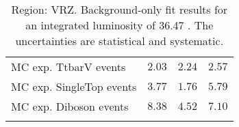 \begin{table}
\begin{center}
{\begin{tabular*}{\textwidth}{@{\extracolsep{\fill}}lrrr}
        MC exp. TtbarV events         & $2.03$          & $2.24$          & $2.57$              \\
        MC exp. SingleTop events         & $3.77$          & $1.76$          & $5.79$              \\
        MC exp. Diboson events         & $8.38$          & $4.52$          & $7.10$              \\
\noalign{\smallskip}\hline\noalign{\smallskip}
\end{tabular*}
}
\end{center}
\caption{Region: VRZ. Background-only fit results for an integrated luminosity of 36.47 \ifb. The uncertainties are statistical and systematic.
}
\label{table.bkgonly.VRZ}
\end{table}
%